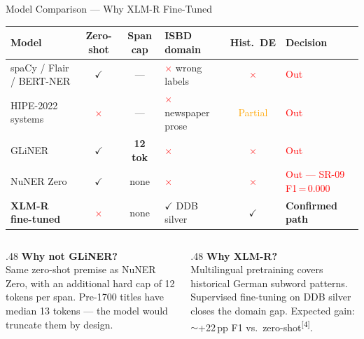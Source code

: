 \documentclass[xcolor,aspectratio=169,compress]{beamer}
\begin{document}
\begin{frame}{Model Comparison --- Why XLM-R Fine-Tuned}
  \footnotesize
  \begin{tabular}{lcc>{\raggedright\arraybackslash}p{2cm}c>{\raggedright\arraybackslash}p{2.8cm}}
    \toprule
    Model & Zero-shot & Span cap & ISBD domain & Hist.\ DE & Decision \\
    \midrule
    spaCy / Flair / BERT-NER
      & \textcolor{green!60!black}{$\checkmark$}
      & ---
      & \textcolor{red}{$\times$} wrong labels
      & \textcolor{red}{$\times$}
      & \textcolor{red}{Out} \\[2pt]
    HIPE-2022 systems
      & \textcolor{red}{$\times$}
      & ---
      & \textcolor{red}{$\times$} newspaper prose
      & \textcolor{orange}{Partial}
      & \textcolor{red}{Out} \\[2pt]
    GLiNER
      & \textcolor{green!60!black}{$\checkmark$}
      & \textbf{12 tok}
      & \textcolor{red}{$\times$}
      & \textcolor{red}{$\times$}
      & \textcolor{red}{Out} \\[2pt]
    NuNER Zero
      & \textcolor{green!60!black}{$\checkmark$}
      & none
      & \textcolor{red}{$\times$}
      & \textcolor{red}{$\times$}
      & \textcolor{red}{Out — SR-09 F1\,=\,0.000} \\[2pt]
    \textbf{XLM-R fine-tuned}
      & \textcolor{red}{$\times$}
      & none
      & \textcolor{green!60!black}{$\checkmark$} DDB silver
      & \textcolor{green!60!black}{$\checkmark$}
      & \textcolor{green!60!black}{\textbf{Confirmed path}} \\
    \bottomrule
  \end{tabular}
  \smallskip

  \begin{columns}[t]
    \begin{column}{.48\textwidth}
      \textbf{Why not GLiNER?} \\
      Same zero-shot premise as NuNER Zero, with an additional hard cap of 12 tokens per span.
      Pre-1700 titles have median 13 tokens --- the model would truncate them by design.
    \end{column}
    \begin{column}{.48\textwidth}
      \textbf{Why XLM-R?} \\
      Multilingual pretraining covers historical German subword patterns.
      Supervised fine-tuning on DDB silver closes the domain gap.
      Expected gain: $\sim$+22\,pp F1 vs.\ zero-shot\textsuperscript{[4]}.
    \end{column}
  \end{columns}
\end{frame}
\end{document}
